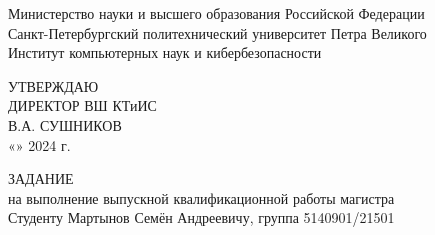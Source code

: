 \begin{center}

Министерство науки и высшего образования Российской Федерации\\
Санкт-Петербургский политехнический университет Петра Великого\\
Институт компьютерных наук и кибербезопасности\\
[1.2cm]

\begin{flushleft}
    \hspace{8.5cm}УТВЕРЖДАЮ\\
    \hspace{8.5cm}ДИРЕКТОР ВШ КТиИС\\
    \hspace{8.5cm}\underline{\hspace{3.5cm}} В.А. СУШНИКОВ\\
    \hspace{8.5cm}«\underline{\hspace{1.0cm}}»\underline{\hspace{3.5cm}} 2024 г.\\[0.8cm]
\end{flushleft}

ЗАДАНИЕ\\
на выполнение выпускной квалификационной работы магистра\\[1.0cm]

Студенту Мартынов Семён Андреевичу, группа 5140901/21501\hspace{1cm}\\[0.8cm]



\end{center}
